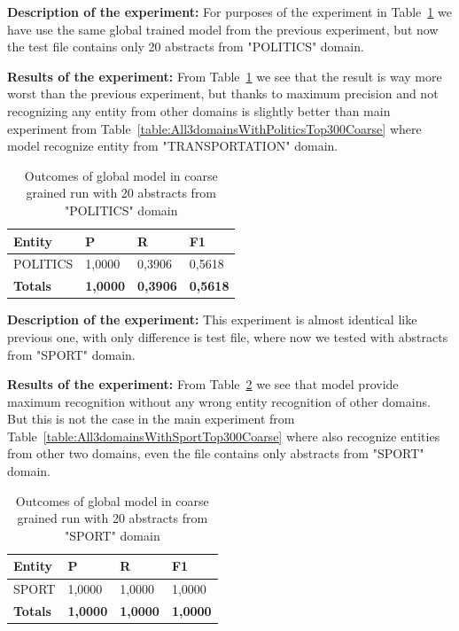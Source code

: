 \documentclass[thesis=M,english]{FITthesis}[2018/05/30]
\begin{document}
\textbf{Description of the experiment:} For purposes of the experiment in Table~\ref{table:GlobalDomainWithPoliticsTop20Coarse} we have use the same global trained model from the previous experiment, but now the test file contains only 20 abstracts from "POLITICS" domain. 

\textbf{Results of the experiment:} From Table~\ref{table:GlobalDomainWithPoliticsTop20Coarse} we see that the result is way more worst than the previous experiment, but thanks to maximum precision and not recognizing any entity from other domains is slightly better than main experiment from Table~\ref{table:All3domainsWithPoliticsTop300Coarse} where model recognize entity from "TRANSPORTATION" domain.

	\begin{table}[H]\centering
		\begin{tabular}{|l|l|l|l|}
			\hline {\textbf{Entity}} & {\textbf{P}} & {\textbf{R}} & {\textbf{F1}}\\\hline
				POLITICS & 1,0000 & 0,3906 & 0,5618\\\hline
				\textbf{Totals} & \textbf{1,0000} & \textbf{0,3906} & \textbf{0,5618}\\\hline
		\end{tabular}
		\caption{Outcomes of global model in coarse grained run with 20 abstracts from "POLITICS" domain \label{table:GlobalDomainWithPoliticsTop20Coarse}}
	\end{table}

\textbf{Description of the experiment:} This experiment is almost identical like previous one, with only difference is test file, where now we tested with abstracts from "SPORT" domain.

\textbf{Results of the experiment:} From Table~\ref{table:GlobalDomainWithSportTop20Coarse} we see that model provide maximum recognition without any wrong entity recognition of other domains. But this is not the case in the main experiment from Table~\ref{table:All3domainsWithSportTop300Coarse} where also recognize entities from other two domains, even the file contains only abstracts from "SPORT" domain. 

	\begin{table}[H]\centering
		\begin{tabular}{|l|l|l|l|}
			\hline {\textbf{Entity}} & {\textbf{P}} & {\textbf{R}} & {\textbf{F1}}\\\hline
				SPORT & 1,0000 & 1,0000 & 1,0000\\\hline
				\textbf{Totals} & \textbf{1,0000} & \textbf{1,0000} & \textbf{1,0000}\\\hline
		\end{tabular}
		\caption{Outcomes of global model in coarse grained run with 20 abstracts from "SPORT" domain \label{table:GlobalDomainWithSportTop20Coarse}}
	\end{table}	
\end{document}
